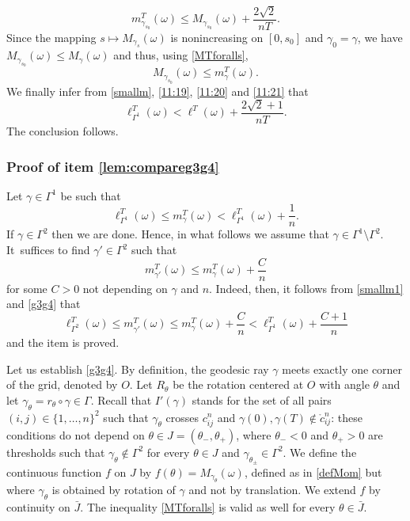 \documentclass[10pt]{amsart}
\theoremstyle{definition}
\begin{document}
\begin{equation}\label{11:20}
m^T_{\gamma_{s_0}} (\omega) \leq M_{\gamma_{s_0}} (\omega) + \frac{2 \sqrt{2}}{nT}.
\end{equation}
Since the mapping $s\mapsto M_{\gamma_s}(\omega)$ is nonincreasing on $[0,s_0]$ and $\gamma_0=\gamma$, we have $M_{\gamma_{s_0}} (\omega) \leq M_{\gamma} (\omega)$ and thus, using \eqref{MTforalls},
\begin{equation}\label{11:21}
M_{\gamma_{s_0}} (\omega) \leq m^T_\gamma(\omega).
\end{equation}
We finally infer from \eqref{smallm}, \eqref{11:19}, \eqref{11:20} and \eqref{11:21} that
\[
\ell_{\Gamma^1}^T(\omega) < \ell^T(\omega)+\frac{2 \sqrt{2}+ 1}{nT}.
\]
The conclusion follows.

\subsubsection*{Proof of item \eqref{lem:compareg3g4}}
Let $\gamma\in\Gamma^1$ be such that
\begin{equation} \label{smallm1}
\ell^T_{\Gamma^1}(\omega)\leq m^T_\gamma(\omega) < \ell^T_{\Gamma^1}(\omega) + \frac{1}{n}.
\end{equation}
If $\gamma\in\Gamma^2$ then we are done. Hence, in what follows we assume that $\gamma \in \Gamma^1 \setminus \Gamma^2$. It~suffices to find $\gamma' \in \Gamma^2$ such that
\begin{equation} \label{g3g4}
m^T_{\gamma'} (\omega) \leq m^T_{\gamma}(\omega) + \frac{C}{n}
\end{equation}
for some $C >0$ not depending on $\gamma$ and $n$. Indeed, then, it follows from \eqref{smallm1} and \eqref{g3g4} that
\[
\ell^T_{\Gamma^2}(\omega)\leq m^T_{\gamma'} (\omega)\leq m^T_{\gamma}(\omega) + \frac{C}{n}< \ell^T_{\Gamma^1}(\omega) + \frac{C+1}{n}
\]
and the item is proved.

Let us establish \eqref{g3g4}.
By definition, the geodesic ray $\gamma$ meets exactly one corner of the grid, denoted by $O$.
Let $R_\theta$ be the rotation centered at $O$ with angle $\theta$ and let $\gamma_\theta=r_\theta \circ \gamma \in\Gamma$. Recall that $I'(\gamma)$ stands for the set of all pairs $(i,j)\in \{1,\ldots,n\}^2$ such that $\gamma_\theta$ crosses $c_{ij}^n$ and $\gamma(0), \gamma(T) \notin \mathring{c}_{ij}^n$: these conditions do not depend on $\theta \in J= (\theta_-, \theta_+)$, where $\theta_-<0$ and $\theta_+ >0$ are thresholds such that $\gamma_\theta \notin \Gamma^2$ for every $\theta \in J$ and $\gamma_{\theta_\pm} \in \Gamma^2$. We define the {continuous} function $f$ on $J$ by $f(\theta)=M_{\gamma_\theta} (\omega)$, defined as in \eqref{defMom} but where $\gamma_\theta$ is obtained by rotation of $\gamma$ and not by translation. We extend $f$ by continuity on $\bar{J}$. The inequality \eqref{MTforalls} is valid as well for every $\theta\in \bar J$.
\end{document}
